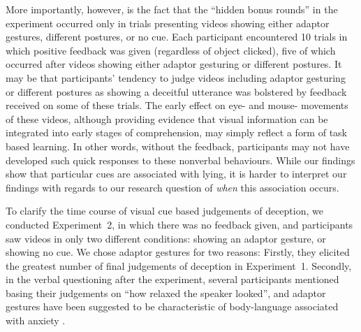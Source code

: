 \documentclass[a4paper,man,natbib]{apa6}
\newcommand*{\spex}[1]{``{#1}''} %
\begin{document}
More importantly, however, is the fact that the ``hidden bonus rounds'' in the experiment occurred only in trials presenting videos showing either adaptor gestures, different postures, or no cue. 
Each participant encountered 10 trials in which positive feedback was given (regardless of object clicked), five of which occurred after videos showing either adaptor gesturing or different postures. 
It may be that participants' tendency to judge videos including adaptor gesturing or different postures as showing a deceitful utterance was bolstered by feedback received on some of these trials. 
The early effect on eye- and mouse- movements of these videos, although providing evidence that visual information can be integrated into early stages of comprehension, may simply reflect a form of task based learning.
In other words, without the feedback, participants may not have developed such quick responses to these nonverbal behaviours.
While our findings show that particular cues are associated with lying, it is harder to interpret our findings with regards to our research question of \textit{when} this association occurs.

To clarify the time course of visual cue based judgements of deception, we conducted Experiment~2, in which there was no feedback given, and participants saw videos in only two different conditions: showing an adaptor gesture, or showing no cue. 
We chose adaptor gestures for two reasons: Firstly, they elicited the greatest number of final judgements of deception in Experiment~1. 
Secondly, in the verbal questioning after the experiment, several participants mentioned basing their judgements on \spex{how relaxed the speaker looked}, and adaptor gestures have been suggested to be characteristic of body-language associated with anxiety \citep[see][]{Gregersen2005}.
\end{document}
